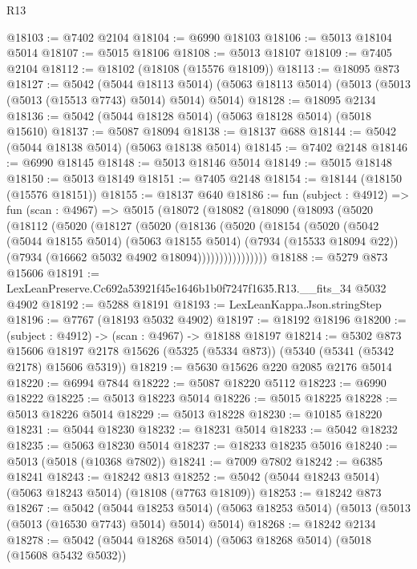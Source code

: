 \begin{lexlean}{R13}
\begin{coremodule}
@18103 := @7402 @2104
@18104 := @6990 @18103
@18106 := @5013 @18104 @5014
@18107 := @5015 @18106
@18108 := @5013 @18107
@18109 := @7405 @2104
@18112 := @18102 (@18108 (@15576 @18109))
@18113 := @18095 @873
@18127 := @5042
    (@5044 @18113 @5014)
    (@5063 @18113 @5014)
    (@5013 (@5013 (@5013 (@15513 @7743) @5014) @5014) @5014)
@18128 := @18095 @2134
@18136 := @5042 (@5044 @18128 @5014) (@5063 @18128 @5014) (@5018 @15610)
@18137 := @5087 @18094
@18138 := @18137 @688
@18144 := @5042 (@5044 @18138 @5014) (@5063 @18138 @5014)
@18145 := @7402 @2148
@18146 := @6990 @18145
@18148 := @5013 @18146 @5014
@18149 := @5015 @18148
@18150 := @5013 @18149
@18151 := @7405 @2148
@18154 := @18144 (@18150 (@15576 @18151))
@18155 := @18137 @640
@18186 := fun (subject : @4912) =>
  fun (scan : @4967) =>
  @5015
    (@18072
      (@18082
        (@18090
          (@18093
            (@5020
              (@18112
                (@5020
                  (@18127
                    (@5020
                      (@18136
                        (@5020
                          (@18154
                            (@5020
                              (@5042
                                (@5044 @18155 @5014)
                                (@5063 @18155 @5014)
                                (@7934 (@15533 @18094 @22))
                                (@7934 (@16662 @5032 @4902 @18094))))))))))))))))
@18188 := @5279 @873 @15606
@18191 := LexLeanPreserve.Cc692a53921f45e1646b1b0f7247f1635.R13.__fits_34 @5032 @4902
@18192 := @5288 @18191
@18193 := LexLeanKappa.Json.stringStep
@18196 := @7767 (@18193 @5032 @4902)
@18197 := @18192 @18196
@18200 := (subject : @4912) -> (scan : @4967) -> @18188 @18197
@18214 := @5302
    @873
    @15606
    @18197
    @2178
    @15626
    (@5325 (@5334 @873))
    (@5340 (@5341 (@5342 @2178) @15606 @5319))
@18219 := @5630 @15626 @220 @2085 @2176 @5014
@18220 := @6994 @7844
@18222 := @5087 @18220 @5112
@18223 := @6990 @18222
@18225 := @5013 @18223 @5014
@18226 := @5015 @18225
@18228 := @5013 @18226 @5014
@18229 := @5013 @18228
@18230 := @10185 @18220
@18231 := @5044 @18230
@18232 := @18231 @5014
@18233 := @5042 @18232
@18235 := @5063 @18230 @5014
@18237 := @18233 @18235 @5016
@18240 := @5013 (@5018 (@10368 @7802))
@18241 := @7009 @7802
@18242 := @6385 @18241
@18243 := @18242 @813
@18252 := @5042 (@5044 @18243 @5014) (@5063 @18243 @5014) (@18108 (@7763 @18109))
@18253 := @18242 @873
@18267 := @5042
    (@5044 @18253 @5014)
    (@5063 @18253 @5014)
    (@5013 (@5013 (@5013 (@16530 @7743) @5014) @5014) @5014)
@18268 := @18242 @2134
@18278 := @5042 (@5044 @18268 @5014) (@5063 @18268 @5014) (@5018 (@15608 @5432 @5032))

\end{coremodule}
\end{lexlean}
